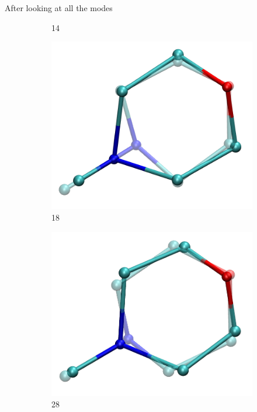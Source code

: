 \documentclass{beamer}
\begin{document}
\begin{frame}{After looking at all the modes}
\begin{figure}
\begin{subfigure}{\widthx\textwidth}
				\caption{14}
			\end{subfigure}
			\begin{subfigure}{\widthx\textwidth}
			\includegraphics[width=\textwidth]{mode18_ot.png}
			\caption{18}
			\end{subfigure}
			\begin{subfigure}{\widthx\textwidth}
				\includegraphics[width=\textwidth]{mode28_ot.png}
				\caption{28}
			\end{subfigure}
			\begin{subfigure}{\widthx\textwidth}

\end{subfigure}
\end{figure}
\end{frame}
\end{document}
